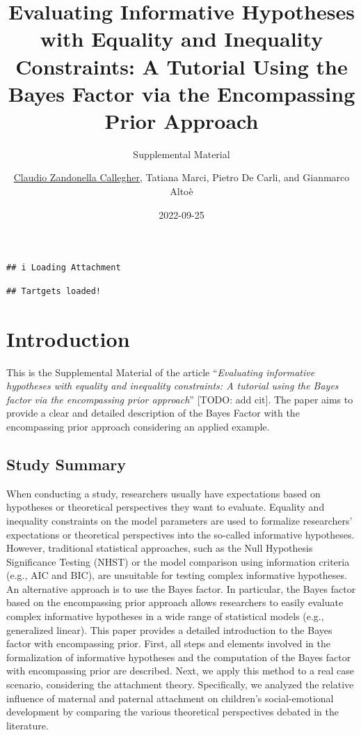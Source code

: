 \documentclass[
]{book}
\title{Evaluating Informative Hypotheses with Equality and Inequality Constraints: A Tutorial Using the Bayes Factor via the Encompassing Prior Approach}
\subtitle{Supplemental Material}
\author{\href{https://claudiozandonella.netlify.app/}{Claudio Zandonella Callegher}, Tatiana Marci, Pietro De Carli, and Gianmarco Altoè}
\date{2022-09-25}
\begin{document}
\maketitle

{
\setcounter{tocdepth}{1}
\tableofcontents
}
\begin{verbatim}
## i Loading Attachment
\end{verbatim}

\begin{verbatim}
## Tartgets loaded!
\end{verbatim}

\hypertarget{introduction}{%
\chapter*{Introduction}\label{introduction}}

This is the Supplemental Material of the article ``\emph{Evaluating informative hypotheses with equality and inequality constraints: A tutorial using the Bayes factor via the encompassing prior approach}'' {[}TODO: add cit{]}. The paper aims to provide a clear and detailed description of the Bayes Factor with the encompassing prior approach considering an applied example.

\hypertarget{study-summary}{%
\section*{Study Summary}\label{study-summary}}

When conducting a study, researchers usually have expectations based on hypotheses or theoretical perspectives they want to evaluate. Equality and inequality constraints on the model parameters are used to formalize researchers' expectations or theoretical perspectives into the so-called informative hypotheses. However, traditional statistical approaches, such as the Null Hypothesis Significance Testing (NHST) or the model comparison using information criteria (e.g., AIC and BIC), are unsuitable for testing complex informative hypotheses. An alternative approach is to use the Bayes factor. In particular, the Bayes factor based on the encompassing prior approach allows researchers to easily evaluate complex informative hypotheses in a wide range of statistical models (e.g., generalized linear). This paper provides a detailed introduction to the Bayes factor with encompassing prior. First, all steps and elements involved in the formalization of informative hypotheses and the computation of the Bayes factor with encompassing prior are described. Next, we apply this method to a real case scenario, considering the attachment theory. Specifically, we analyzed the relative influence of maternal and paternal attachment on children's social-emotional development by comparing the various theoretical perspectives debated in the literature.
\end{document}
